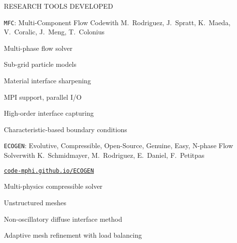 \documentclass{resume} %
\begin{document}
\begin{rSection}{{\Large R}ESEARCH TOOLS DEVELOPED}
\begin{rSubsections}{\texttt{MFC}: Multi-Component Flow Code}{}{with M.\ Rodriguez, J.\ Spratt, K.\ Maeda, V.\ Coralic, J.\ Meng, T.\ Colonius}{}
    \vspace{-0.1cm}
    \begin{minipage}{0.45\linewidth}
	\begin{list}{\textbullet}{\leftmargin=2.5em} 
     	\item Multi-phase flow solver 
        \item Sub-grid particle models 
        \item Material interface sharpening
  	\end{list}
    \end{minipage}
    \hspace{-0.5cm}
    \begin{minipage}{0.65\linewidth}
	\begin{list}{\textbullet}{\leftmargin=2.5em} 
        \item MPI support, parallel I/O
        \item High-order interface capturing
        \item Characteristic-based boundary conditions
  	\end{list}
    \end{minipage}
\end{rSubsections}
\medskip

\begin{rSubsections}{\texttt{ECOGEN}: Evolutive, Compressible, Open-Source, Genuine, Easy, N-phase Flow Solver}{}{with K.\ Schmidmayer, M.\ Rodriguez, E.\ Daniel, F.\ Petitpas}{}

\vspace{-0.4cm}
\href{https://code-mphi.github.io/ECOGEN/}{\texttt{code-mphi.github.io/ECOGEN}}

    \vspace{-0.1cm}
    \begin{minipage}{0.45\linewidth}
	\begin{list}{\textbullet}{\leftmargin=2.5em} 
        \item Multi-physics compressible solver
        \item Unstructured meshes
  	\end{list}
    \end{minipage}
    \hspace{-0.5cm}
    \begin{minipage}{0.65\linewidth}
	\begin{list}{\textbullet}{\leftmargin=2.5em} 
        \item Non-oscillatory diffuse interface method
        \item Adaptive mesh refinement with load balancing
  	\end{list}
    \end{minipage}
\end{rSubsections}
\medskip


\end{rSection}
\end{document}
